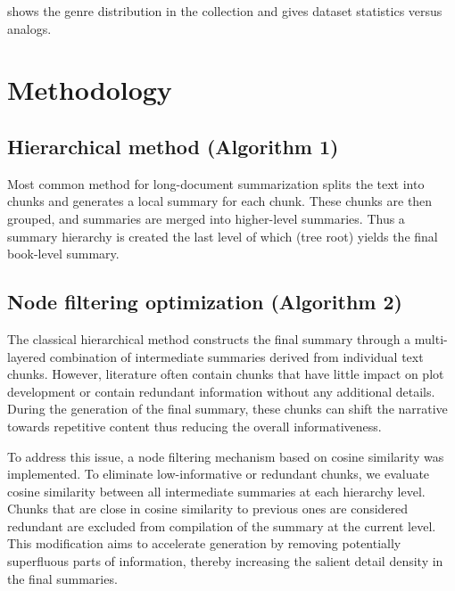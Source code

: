 \documentclass{superfri}
\begin{document}
 shows the genre distribution in the collection and  gives dataset statistics versus analogs.

\section{Methodology}
\subsection{Hierarchical method (Algorithm 1)}
Most common method for long-document summarization \cite{hierarchical} splits the text into chunks and
generates a local summary for each chunk.
These chunks are then grouped, and summaries are merged into higher-level summaries.
Thus a summary hierarchy is created the last level of which (tree root) yields the final book-level summary.

\subsection{Node filtering optimization (Algorithm 2)}
The classical hierarchical method constructs the final summary through a multi-layered combination of intermediate summaries derived from individual text chunks.
However, literature often contain chunks that have little impact on plot development or contain redundant information without any additional details. 
During the generation of the final summary, these chunks can shift the narrative towards repetitive content thus reducing the overall informativeness.

To address this issue, a node filtering mechanism based on cosine similarity was implemented.
To eliminate low-informative or redundant chunks, we evaluate cosine similarity between all intermediate summaries at each hierarchy level.
Chunks that are close in cosine similarity to previous ones are considered redundant are excluded from compilation of the summary at the current level.
This modification aims to accelerate generation by removing potentially superfluous parts of information, 
thereby increasing the salient detail density in the final summaries.
\end{document}
